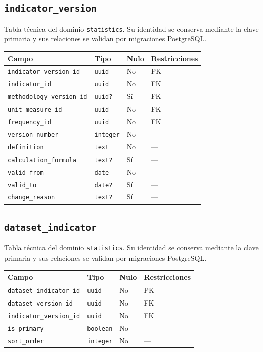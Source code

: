 \documentclass[11pt]{article}
\begin{document}
\subsection{\texttt{indicator\_version}}
Tabla técnica del dominio \texttt{statistics}. Su identidad se conserva mediante la clave primaria y sus relaciones se validan por migraciones PostgreSQL.
\begin{longtable}{>{\raggedright\arraybackslash}p{} p{} p{} p{}}
\toprule Campo & Tipo & Nulo & Restricciones \\ \midrule\endhead
\texttt{indicator\_version\_id} & \texttt{uuid} & No & PK \\
\texttt{indicator\_id} & \texttt{uuid} & No & FK \\
\texttt{methodology\_version\_id} & \texttt{uuid?} & Sí & FK \\
\texttt{unit\_measure\_id} & \texttt{uuid} & No & FK \\
\texttt{frequency\_id} & \texttt{uuid} & No & FK \\
\texttt{version\_number} & \texttt{integer} & No & --- \\
\texttt{definition} & \texttt{text} & No & --- \\
\texttt{calculation\_formula} & \texttt{text?} & Sí & --- \\
\texttt{valid\_from} & \texttt{date} & No & --- \\
\texttt{valid\_to} & \texttt{date?} & Sí & --- \\
\texttt{change\_reason} & \texttt{text?} & Sí & --- \\
\bottomrule\end{longtable}
\subsection{\texttt{dataset\_indicator}}
Tabla técnica del dominio \texttt{statistics}. Su identidad se conserva mediante la clave primaria y sus relaciones se validan por migraciones PostgreSQL.
\begin{longtable}{>{\raggedright\arraybackslash}p{} p{} p{} p{}}
\toprule Campo & Tipo & Nulo & Restricciones \\ \midrule\endhead
\texttt{dataset\_indicator\_id} & \texttt{uuid} & No & PK \\
\texttt{dataset\_version\_id} & \texttt{uuid} & No & FK \\
\texttt{indicator\_version\_id} & \texttt{uuid} & No & FK \\
\texttt{is\_primary} & \texttt{boolean} & No & --- \\
\texttt{sort\_order} & \texttt{integer} & No & --- \\
\bottomrule\end{longtable}
\end{document}
